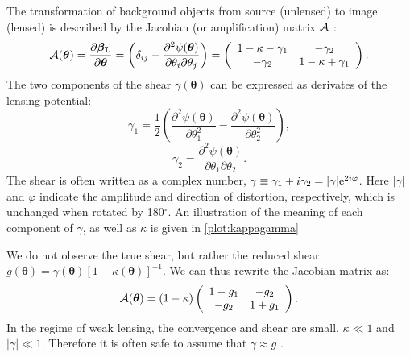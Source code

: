 The transformation of background objects from source (unlensed) to image (lensed) is described by the Jacobian (or amplification) matrix $\cal{A}$ \citep{DodelsonText}: 
\begin{equation}
\label{eqn:A}
{\cal A}(\bm{\theta}) = \frac{\partial \bm{\beta_{\rm L}}}{\partial \bm{\theta}}  = \left( \delta_{ij} - \frac{\partial^2 \psi(\bm{\theta})}{\partial \theta_{i} \partial \theta_j} \right) = \left( \begin{array}{cc}
{1-\kappa-\gamma_1} & {-\gamma_2} \\
{-\gamma_2} & {1-\kappa+\gamma_1} \\
\end{array} \right). 
\end{equation}
The two components of the shear $\gamma (\bm{\theta})$ can be expressed as derivates of the lensing potential:
\begin{equation}
\gamma_1 = \frac{1}{2} \left( \frac{\partial^2 \psi(\bm{\theta})}{\partial\theta_1^2} - \frac{\partial^2 \psi(\bm{\theta})}{\partial\theta_2^2} \right), 
\end{equation}
\begin{equation}
\gamma_2 = \frac{\partial^2 \psi(\bm{\theta})}{\partial\theta_1 \partial\theta_2}.
\end{equation}
The shear is often written as a complex number, $\gamma \equiv \gamma_1 + i\gamma_2 = |\gamma|{\rm e}^{2i\varphi}$. Here $|\gamma|$ and $\varphi$ indicate the amplitude and direction of distortion, respectively, which is unchanged when rotated by 180$^\circ$. An illustration of the meaning of each component of $\gamma$, as well as $\kappa$ is given in \autoref{plot:kappagamma}

We do not observe the true shear, but rather the reduced shear  $g(\bm{\theta}) = \gamma (\bm{\theta}) \left[1-\kappa (\bm{\theta}) \right]^{-1}$. We can thus rewrite the Jacobian matrix as:
\begin{equation}
\label{eqn:Ag}
{\cal A}(\bm{\theta}) = (1-\kappa) \left( \begin{array}{cc}
{1-g_1} & {-g_2} \\
{-g_2} & {1+g_1} \\
\end{array} \right). 
\end{equation}
In the regime of weak lensing, the convergence and shear are small, $\kappa \ll 1$ and $| \gamma| \ll 1$. Therefore it is often safe to assume that $\gamma \approx g$ \citep{Schneider06_WeakGravLens}.


